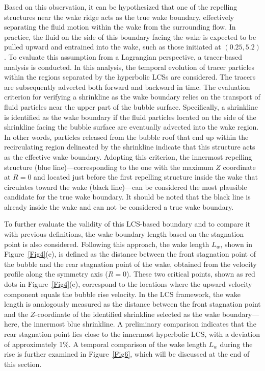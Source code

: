 \documentclass[aps,prfluids,reprint,nofootinbib,onecolumn,groupedaddress,showkeys]{revtex4-2}
\begin{document}
	Based on this observation, it can be hypothesized that one of the repelling structures near the wake ridge acts as the true wake boundary, effectively separating the fluid motion within the wake from the surrounding flow. In practice, the fluid on the side of this boundary facing the wake is expected to be pulled upward and entrained into the wake, such as those initiated at $(0.25, 5.2)$. To evaluate this assumption from a Lagrangian perspective, a tracer-based analysis is conducted. In this analysis, the temporal evolution of tracer particles within the regions separated by the hyperbolic LCSs are considered. The tracers are subsequently advected both forward and backward in time. The evaluation criterion for verifying a shrinkline as the wake boundary relies on the transport of fluid particles near the upper part of the bubble surface. Specifically, a shrinkline is identified as the wake boundary if the fluid particles located on the side of the shrinkline facing the bubble surface are eventually advected into the wake region. In other words, particles released from the bubble roof that end up within the recirculating region delineated by the shrinkline indicate that this structure acts as the effective wake boundary. Adopting this criterion, the innermost repelling structure (blue line)—corresponding to the one with the maximum $Z$ coordinate at $R=0$ and located just before the first repelling structure inside the wake that circulates toward the wake (black line)—can be considered the most plausible candidate for the true wake boundary. It should be noted that the black line is already inside the wake and can not be considered a true wake boundary.
	
	To further evaluate the validity of this LCS-based boundary and to compare it with previous definitions, the wake boundary length based on the stagnation point is also considered. Following this approach, the wake length $L_w$, shown in Figure~\ref{Fig4}(e), is defined as the distance between the front stagnation point of the bubble and the rear stagnation point of the wake, obtained from the velocity profile along the symmetry axis ($R=0$). These two critical points, shown as red dots in Figure~\ref{Fig4}(e), correspond to the locations where the upward velocity component equals the bubble rise velocity. In the LCS framework, the wake length is analogously measured as the distance between the front stagnation point and the $Z$-coordinate of the identified shrinkline selected as the wake boundary—here, the innermost blue shrinkline. A preliminary comparison indicates that the rear stagnation point lies close to the innermost hyperbolic LCS, with a deviation of approximately 1\%. A temporal comparison of the wake length $L_w$ during the rise is further examined in Figure~\ref{Fig6}, which will be discussed at the end of this section.  
	
\end{document}
